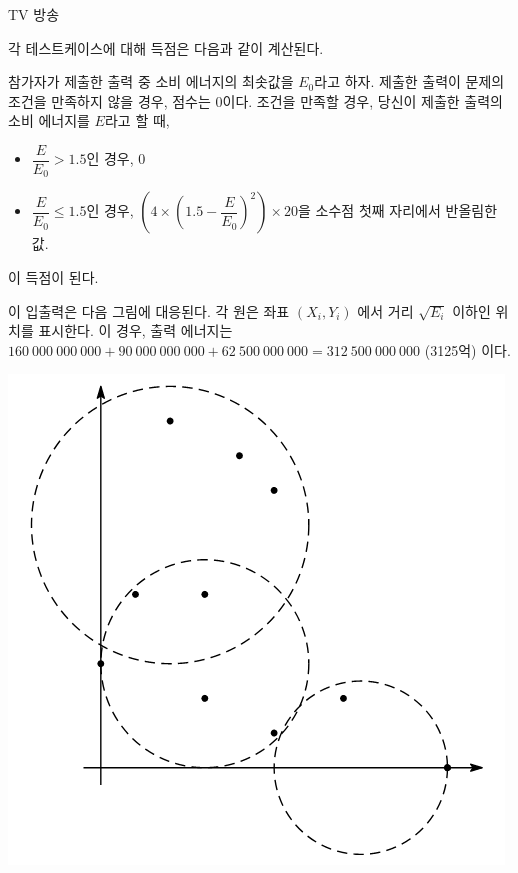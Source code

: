 \begin{problem}{TV 방송}
	\Scoring
	
	각 테스트케이스에 대해 득점은 다음과 같이 계산된다.
	
	참가자가 제출한 출력 중 소비 에너지의 최솟값을 $E_0$라고 하자. 제출한 출력이 문제의 조건을 만족하지 않을 경우, 점수는 0이다. 조건을 만족할 경우, 당신이 제출한 출력의 소비 에너지를 $E$라고 할 때,
	
	\begin{itemize}
		\item $\dfrac{E}{E_0}> 1.5$인 경우, 0
		\item $\dfrac{E}{E_0}\le 1.5$인 경우, $\left(4 \times {\left(1.5-\dfrac{E}{E_0}\right)}^2 \right) \times 20$을 소수점 첫째 자리에서 반올림한 값.
	\end{itemize}

	이 득점이 된다.
	
	\Examples
	
	\renewcommand{\InputFileName}{Sample Input}
	\renewcommand{\OutputFileName}{Sample Output}
	
	\begin{example}
	\end{example}

	이 입출력은 다음 그림에 대응된다. 각 원은 좌표 $(X_i, Y_i)$ 에서 거리 $\sqrt{E_i}$ 이하인 위치를 표시한다. 이 경우, 출력 에너지는 $160\ 000\ 000\ 000+90\ 000\ 000\ 000+ 62\ 500\ 000\ 000 = 312\ 500 \ 000 \ 000$ (3125억) 이다.	
	\begin{center}
	\includegraphics[width=0.5\linewidth]{img1.png}
	\end{center}	
\end{problem}

